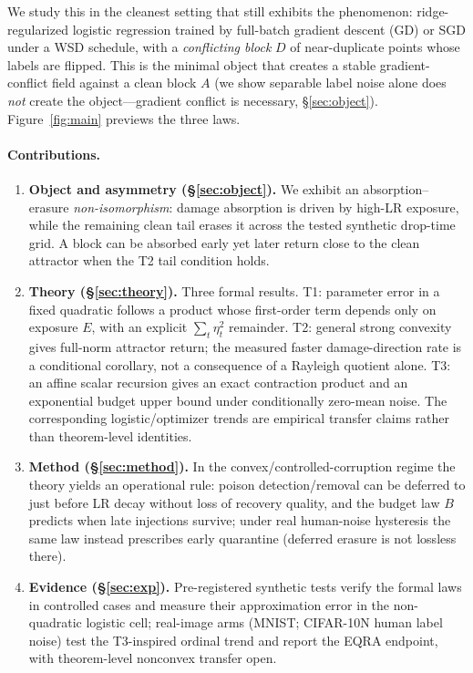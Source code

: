 \documentclass{article}
\newcommand{\Expo}{E}         %
\newcommand{\B}{B}            %
\begin{document}
We study this in the cleanest setting that still exhibits the phenomenon: ridge-regularized
logistic regression trained by full-batch gradient descent (GD) or SGD under a WSD schedule,
with a \emph{conflicting block} $D$ of near-duplicate points whose labels are flipped. This
is the minimal object that creates a stable gradient-conflict field against a clean block $A$
(we show separable label noise alone does \emph{not} create the object---gradient conflict is
necessary, \S\ref{sec:object}). Figure~\ref{fig:main} previews the three laws.

\paragraph{Contributions.}
\begin{enumerate}
\item \textbf{Object and asymmetry (\S\ref{sec:object}).} We exhibit an
absorption--erasure \emph{non-isomorphism}: damage absorption is driven by high-LR exposure,
while the remaining clean tail erases it across the tested synthetic drop-time grid. A block can
be absorbed early yet later return close to the clean attractor when the T2 tail condition holds.
\item \textbf{Theory (\S\ref{sec:theory}).} Three formal results. T1: parameter error in a
fixed quadratic follows a product whose first-order term depends only on exposure $\Expo$, with an explicit
$\sum_t\eta_t^2$ remainder. T2: general strong convexity gives full-norm attractor return;
the measured faster damage-direction rate is a conditional corollary, not a consequence of a
Rayleigh quotient alone. T3: an affine scalar recursion gives an exact contraction product and
an exponential budget upper bound under conditionally zero-mean noise. The corresponding
logistic/optimizer trends are empirical transfer claims rather than theorem-level identities.
\item \textbf{Method (\S\ref{sec:method}).} In the convex/controlled-corruption regime
the theory yields an operational rule: poison detection/removal can be deferred to just
before LR decay without loss of recovery quality, and the budget law $\B$ predicts when
late injections survive; under real human-noise hysteresis the same law instead prescribes
early quarantine (deferred erasure is not lossless there).
\item \textbf{Evidence (\S\ref{sec:exp}).} Pre-registered synthetic tests verify the formal
laws in controlled cases and measure their approximation error in the non-quadratic logistic
cell; real-image arms (MNIST; CIFAR-10N human label noise) test the T3-inspired ordinal trend
and report the EQRA endpoint, with theorem-level nonconvex transfer open.
\end{enumerate}
\end{document}
